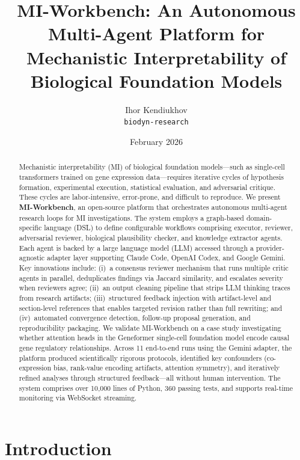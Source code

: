 \documentclass[11pt,a4paper]{article}
\title{MI-Workbench: An Autonomous Multi-Agent Platform for\\Mechanistic Interpretability of Biological Foundation Models}
\author{
  Ihor Kendiukhov \\
  \texttt{biodyn-research}
}
\date{February 2026}
\begin{document}
\maketitle


\begin{abstract}
Mechanistic interpretability (MI) of biological foundation models---such as single-cell transformers trained on gene expression data---requires iterative cycles of hypothesis formation, experimental execution, statistical evaluation, and adversarial critique.
These cycles are labor-intensive, error-prone, and difficult to reproduce.
We present \textbf{MI-Workbench}, an open-source platform that orchestrates autonomous multi-agent research loops for MI investigations.
The system employs a graph-based domain-specific language (DSL) to define configurable workflows comprising executor, reviewer, adversarial reviewer, biological plausibility checker, and knowledge extractor agents.
Each agent is backed by a large language model (LLM) accessed through a provider-agnostic adapter layer supporting Claude Code, OpenAI Codex, and Google Gemini.
Key innovations include: (i)~a consensus reviewer mechanism that runs multiple critic agents in parallel, deduplicates findings via Jaccard similarity, and escalates severity when reviewers agree; (ii)~an output cleaning pipeline that strips LLM thinking traces from research artifacts; (iii)~structured feedback injection with artifact-level and section-level references that enables targeted revision rather than full rewriting; and (iv)~automated convergence detection, follow-up proposal generation, and reproducibility packaging.
We validate MI-Workbench on a case study investigating whether attention heads in the Geneformer single-cell foundation model encode causal gene regulatory relationships.
Across 11 end-to-end runs using the Gemini adapter, the platform produced scientifically rigorous protocols, identified key confounders (co-expression bias, rank-value encoding artifacts, attention symmetry), and iteratively refined analyses through structured feedback---all without human intervention.
The system comprises over 10,000 lines of Python, 360 passing tests, and supports real-time monitoring via WebSocket streaming.
\end{abstract}


\section{Introduction}
\label{sec:introduction}
\end{document}
